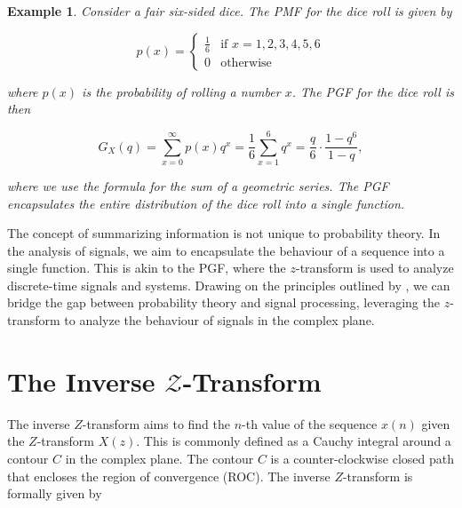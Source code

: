 \documentclass[a4paper]{report}
\newtheorem{example}{Example}
\begin{document}
\begin{example}
    Consider a fair six-sided dice. The PMF for the dice roll is given by
    
    \begin{equation}
        p(x) = \begin{cases}
            \frac{1}{6} & \text{if } x = 1, 2, 3, 4, 5, 6 \\
            0 & \text{otherwise}
        \end{cases}
    \end{equation}

    where $p(x)$ is the probability of rolling a number $x$. The PGF for the dice roll is then

    \begin{equation}
        G_X(q) = \sum^{\infty}_{x = 0} p(x)q^x = \frac{1}{6} \sum^6_{x = 1} q^x = \frac{q}{6}\cdot \frac{1-q^6}{1-q},
    \end{equation}

    where we use the formula for the sum of a geometric series. The PGF encapsulates the entire distribution of the dice roll into a single function.
\end{example}

The concept of summarizing information is not unique to probability theory. In the analysis of signals, we aim to encapsulate the behaviour of a sequence into a single function. This is akin to the PGF, where the $z$-transform is used to analyze discrete-time signals and systems. Drawing on the principles outlined by \citet{ross2014introduction}, we can bridge the gap between probability theory and signal processing, leveraging the $z$-transform to analyze the behaviour of signals in the complex plane.

\section{The Inverse \texorpdfstring{$\mathcal{Z}$}{Lg}-Transform}

The inverse $Z$-transform aims to find the $n$-th value of the sequence $x(n)$ given the $Z$-transform $X(z)$. This is commonly defined as a Cauchy integral around a contour $C$ in the complex plane. The contour $C$ is a counter-clockwise closed path that encloses the region of convergence (ROC). The inverse $Z$-transform is formally given by
\end{document}
